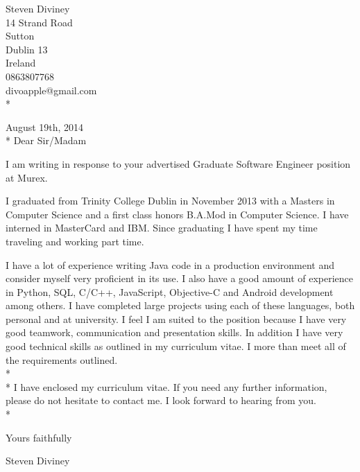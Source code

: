 \documentclass{res}
\begin{document}
 
\begin{resume}

\begin{flushright}
   Steven Diviney \\
   14 Strand Road \\
   Sutton \\
   Dublin 13 \\
   Ireland \\
   0863807768 \\
   divoapple@gmail.com \\* \vspace{10 mm}
\end{flushright}
\begin{flushleft}
 
August 19th, 2014\\*\vspace{10 mm}
Dear Sir/Madam
\end{flushleft}
I am writing in response to your advertised Graduate Software Engineer position at Murex.

I graduated from Trinity College Dublin in November 2013 with a Masters in Computer Science and a first class honors B.A.Mod in Computer Science. I have interned in MasterCard and IBM. Since graduating I have spent my time traveling and working part time.

I have a lot of experience writing Java code in a production environment and consider myself very proficient in its use. I also have a good amount of experience in Python, SQL, C/C++, JavaScript, Objective-C and Android development among others. I have completed large projects using each of these languages, both personal and at university. 
I feel I am suited to the position because I have very good teamwork, communication and presentation skills. In addition I have very good technical skills as outlined in my curriculum vitae. I more than meet all of the requirements outlined.
\\*
\\*
I have enclosed my curriculum vitae. If you need any further information, please do not hesitate to contact me. I look forward to hearing from you.\\*

\begin{flushleft}
Yours faithfully\\\vspace{10mm}

Steven Diviney\\
\end{flushleft}

\end{resume}
\end{document}
